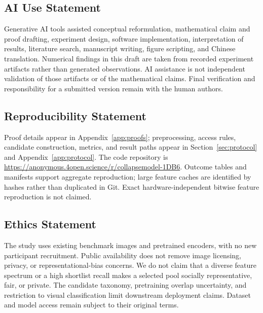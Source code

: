 \subsection*{AI Use Statement}
Generative AI tools assisted conceptual reformulation, mathematical claim and proof drafting, experiment design, software implementation, interpretation of results, literature search, manuscript writing, figure scripting, and Chinese translation. Numerical findings in this draft are taken from recorded experiment artifacts rather than generated observations. AI assistance is not independent validation of those artifacts or of the mathematical claims. Final verification and responsibility for a submitted version remain with the human authors.

\subsection*{Reproducibility Statement}
Proof details appear in Appendix~\ref{app:proofs}; preprocessing, access rules, candidate construction, metrics, and result paths appear in Section~\ref{sec:protocol} and Appendix~\ref{app:protocol}. The code repository is \url{https://anonymous.4open.science/r/collapsemodel-1DB6}. Outcome tables and manifests support aggregate reproduction; large feature caches are identified by hashes rather than duplicated in Git. Exact hardware-independent bitwise feature reproduction is not claimed.

\subsection*{Ethics Statement}
The study uses existing benchmark images and pretrained encoders, with no new participant recruitment. Public availability does not remove image licensing, privacy, or representational-bias concerns. We do not claim that a diverse feature spectrum or a high shortlist recall makes a selected pool socially representative, fair, or private. The candidate taxonomy, pretraining overlap uncertainty, and restriction to visual classification limit downstream deployment claims. Dataset and model access remain subject to their original terms.
